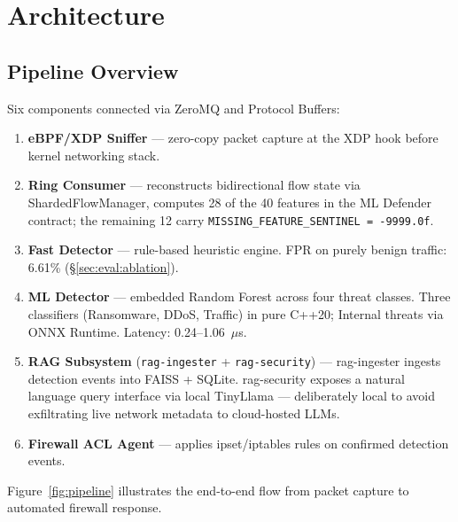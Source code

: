 \documentclass[11pt,a4paper]{article}
\begin{document}
    \section{Architecture}

    \subsection{Pipeline Overview}

    Six components connected via ZeroMQ and Protocol Buffers:

    \begin{enumerate}
        \item \textbf{eBPF/XDP Sniffer} --- zero-copy packet capture at the XDP hook before kernel
        networking stack.
        \item \textbf{Ring Consumer} --- reconstructs bidirectional flow state via
        ShardedFlowManager, computes 28 of the 40 features in the ML Defender contract; the
        remaining 12 carry \texttt{MISSING\_FEATURE\_SENTINEL = -9999.0f}.
        \item \textbf{Fast Detector} --- rule-based heuristic engine. FPR on purely benign traffic:
        6.61\% (\S\ref{sec:eval:ablation}).
        \item \textbf{ML Detector} --- embedded Random Forest across four threat classes. Three
        classifiers (Ransomware, DDoS, Traffic) in pure C++20; Internal threats via ONNX Runtime.
        Latency: 0.24--1.06~$\mu$s.
        \item \textbf{RAG Subsystem} (\texttt{rag-ingester} + \texttt{rag-security}) ---
        rag-ingester ingests detection events into FAISS + SQLite. rag-security exposes a natural
        language query interface via local TinyLlama --- deliberately local to avoid exfiltrating
        live network metadata to cloud-hosted LLMs.
        \item \textbf{Firewall ACL Agent} --- applies ipset/iptables rules on confirmed detection
        events.
    \end{enumerate}

    Figure~\ref{fig:pipeline} illustrates the end-to-end flow from packet capture to
    automated firewall response.
\end{document}
